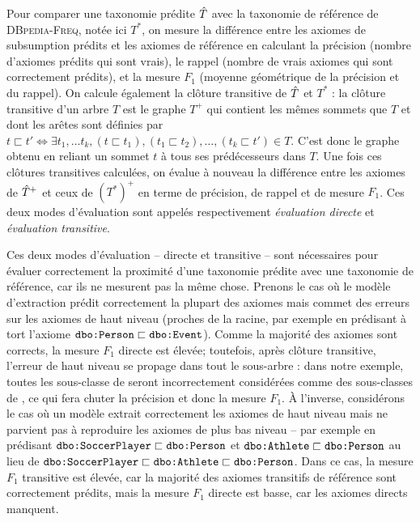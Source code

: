 Pour comparer une taxonomie prédite $\hat{T}$ avec la taxonomie de référence de \textsc{DBpedia-Freq}, notée ici $T^*$, on mesure la différence entre les axiomes de subsumption prédits et les axiomes de référence en calculant la précision (nombre d'axiomes prédits qui sont vrais), le rappel (nombre de vrais axiomes qui sont correctement prédits), et la mesure $F_1$ (moyenne géométrique de la précision et du rappel). On calcule également la clôture transitive de $\hat{T}$ et $T^*$ : la clôture transitive d'un arbre $T$ est le graphe $T^+$ qui contient les mêmes sommets que $T$ et dont les arêtes sont définies par $t \sqsubset t' \iff \exists t_1, \ldots t_k, (t \sqsubset t_1), (t_1 \sqsubset t_2), \ldots, (t_k \sqsubset t') \in T$. C'est donc le graphe obtenu en reliant un sommet $t$ à tous ses prédécesseurs dans $T$. Une fois ces clôtures transitives calculées, on évalue à nouveau la différence entre les axiomes de $\hat{T}^+$ et ceux de $(T^*)^+$ en terme de précision, de rappel et de mesure $F_1$. Ces deux modes d'évaluation sont appelés respectivement \textit{évaluation directe} et \textit{évaluation transitive}.

Ces deux modes d'évaluation – directe et transitive – sont nécessaires pour évaluer correctement la proximité d'une taxonomie prédite avec une taxonomie de référence, car ils ne mesurent pas la même chose. Prenons le cas où le modèle d'extraction prédit correctement la plupart des axiomes mais commet des erreurs sur les axiomes de haut niveau (proches de la racine, par exemple en prédisant à tort l'axiome $\texttt{dbo:Person} \sqsubset \texttt{dbo:Event}$). Comme la majorité des axiomes sont corrects, la mesure $F_1$ directe est élevée; toutefois, après clôture transitive, l'erreur de haut niveau se propage dans tout le sous-arbre : dans notre exemple, toutes les sous-classe de  seront incorrectement considérées comme des sous-classes de , ce qui fera chuter la précision et donc la mesure $F_1$. À l'inverse, considérons le cas où un modèle extrait correctement les axiomes de haut niveau mais ne parvient pas à reproduire les axiomes de plus bas niveau – par exemple en prédisant $\texttt{dbo:SoccerPlayer} \sqsubset \texttt{dbo:Person}$ et $\texttt{dbo:Athlete} \sqsubset \texttt{dbo:Person}$ au lieu de $\texttt{dbo:SoccerPlayer} \sqsubset \texttt{dbo:Athlete} \sqsubset \texttt{dbo:Person}$. Dans ce cas, la mesure $F_1$ transitive est élevée, car la majorité des axiomes transitifs de référence sont correctement prédits, mais la mesure $F_1$ directe est basse, car les axiomes directs manquent. %


